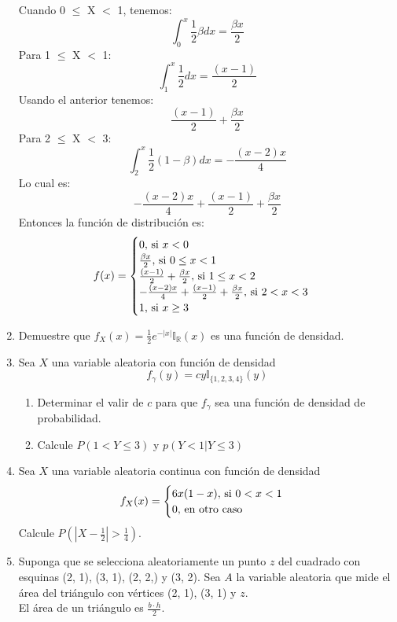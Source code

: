 \documentclass[12pt,a4paper]{report}
\begin{document}
\begin{enumerate}
{			Cuando 0 $\leq$ X $<$ 1, tenemos:
		    \[\int_{0}^{x} \frac{1}{2}\beta dx = \frac{\beta x}{2}\]
		    Para 1 $\leq$ X $<$ 1:
		    \[\int_{1}^{x} \frac{1}{2}dx = \frac{(x-1)}{2}\]
		    Usando el anterior tenemos:
		    \[\frac{(x-1)}{2} +  \frac{\beta x}{2} \]
		    Para 2 $\leq$ X $<$ 3:
		     \[\int_{2}^{x}\frac{1}{2}(1-\beta)dx = -\frac{(x-2)x}{4}\]
		     Lo cual es:
		     \[-\frac{(x-2)x}{4} + \frac{(x-1)}{2} +  \frac{\beta x}{2}\]
		     Entonces la función de distribución es:
		     	\[
				f(x) = \begin{cases}
								0, $ si $ x < 0\\
								\frac{\beta x}{2}, $ si $ 0 \leq x < 1\\
								\frac{(x-1)}{2} +  \frac{\beta x}{2}, $ si $ 1 \leq x < 2\\
								-\frac{(x-2)x}{4} + \frac{(x-1)}{2} +  \frac{\beta x}{2}, $ si $ 2 < x < 3\\
								1, $ si $ x \geq 3
						 	 \end{cases}
			\]
		}
		\item {
			Demuestre que $f_X(x) = \frac{1}{2}e^{-|x|}\mathbb{I}_\mathbb{R}(x)$ es
			una función de densidad.
		}
		\item {
			Sea $X$ una variable aleatoria con función de densidad
				\[f_\gamma(y) = cy \mathbb{I}_{\{1, 2, 3, 4\}}(y)\]
				\begin{enumerate}
					\item {
						Determinar el valir de $c$ para que $f_\gamma$ sea una función de
						densidad de probabilidad.
					}
					\item {
						Calcule $P(1 < Y \leq 3)$ y $p(Y < 1 | Y \leq 3)$
					}
				\end{enumerate}
		}
		\item {
			Sea $X$ una variable aleatoria continua con función de densidad
				\[
					f_X(x) = \begin{cases}
										6x(1-x), $ si $ 0 < x < 1\\
										0, $ en otro caso$
									 \end{cases}
				\]
			Calcule $P(|X-\frac{1}{2}| > \frac{1}{4})$.
		}
		\item {
			Suponga que se selecciona aleatoriamente un punto $z$ del cuadrado con
			esquinas (2, 1), (3, 1), (2, 2,) y (3, 2). Sea $A$ la variable aleatoria
			que mide el área del triángulo con vértices (2, 1), (3, 1) y $z$.\\
			El área de un triángulo es $\frac{b\cdot h}{2}$. \\
}
\end{enumerate}
\end{document}
